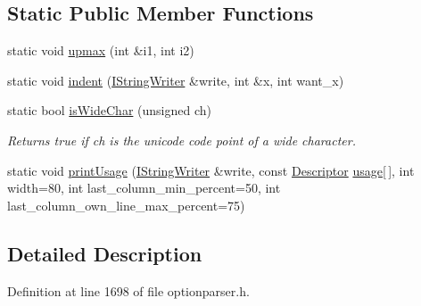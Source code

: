 \subsection*{Static Public Member Functions}
\begin{DoxyCompactItemize}
\item 
static void \hyperlink{struct_option_parser_1_1_print_usage_implementation_a8517859ff8d035d78b4a5c137be4dab0}{upmax} (int \&i1, int i2)
\item 
static void \hyperlink{struct_option_parser_1_1_print_usage_implementation_a4a5d3f07d96ef1bbf7623053d5a5cd48}{indent} (\hyperlink{struct_option_parser_1_1_print_usage_implementation_1_1_i_string_writer}{I\-String\-Writer} \&write, int \&x, int want\-\_\-x)
\item 
static bool \hyperlink{struct_option_parser_1_1_print_usage_implementation_a8e21f84e8fb97ceb650973c5918e597c}{is\-Wide\-Char} (unsigned ch)
\begin{DoxyCompactList}\small\item\em Returns true if ch is the unicode code point of a wide character. \end{DoxyCompactList}\item 
static void \hyperlink{struct_option_parser_1_1_print_usage_implementation_a3d6989a844051e264fd59bf56262a4c8}{print\-Usage} (\hyperlink{struct_option_parser_1_1_print_usage_implementation_1_1_i_string_writer}{I\-String\-Writer} \&write, const \hyperlink{struct_option_parser_1_1_descriptor}{Descriptor} \hyperlink{_selective_community_detection-_x_8cpp_ae4e685e845abde182eb8fc1f87b756ae}{usage}\mbox{[}$\,$\mbox{]}, int width=80, int last\-\_\-column\-\_\-min\-\_\-percent=50, int last\-\_\-column\-\_\-own\-\_\-line\-\_\-max\-\_\-percent=75)
\end{DoxyCompactItemize}


\subsection{Detailed Description}


Definition at line 1698 of file optionparser.\-h.



